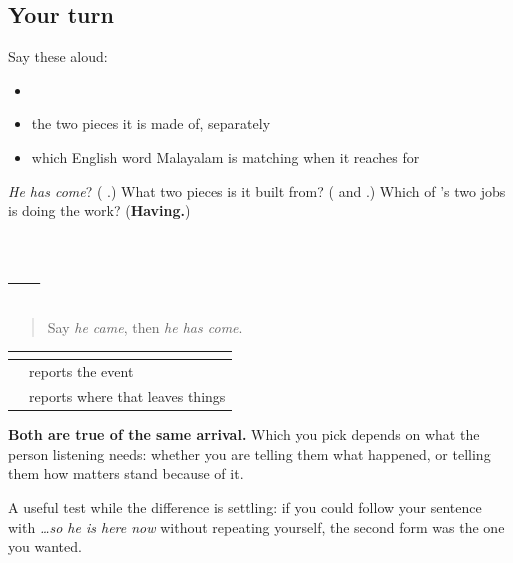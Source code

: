\subsection*{Your turn}
Say these aloud:

\begin{itemize}
\raggedright
  \item \textbf{ }
  \item the two pieces it is made of, separately
  \item which English word Malayalam is matching when it reaches for \textbf{}
\end{itemize}

\begin{tcolorbox}[breakable,colback=teal!4,colframe=teal!35!black,title={Before you move on}]
\emph{He has come}? (\textbf{ }.) What two pieces is it built from? (\textbf{} and \textbf{}.) Which of \textbf{}'s two jobs is doing the work? (\textbf{Having.})
\end{tcolorbox}
\section[Practice]{ — }

\label{lesson:ML-C111-past-or-perfect}



\begin{quote}
Say \emph{he came}, then \emph{he has come}.
\end{quote}

\begin{grammarlens}[title={Grammar Lens: which one a situation asks for}]
\noindent
\begin{tabularx}{\linewidth}{@{}>{\raggedright\arraybackslash}X>{\raggedright\arraybackslash}X@{}}
\toprule
\textbf{} & \textbf{} \\
\midrule
\textbf{\ml{അവൻ} \ml{വന്നു}} & reports the event \\
\textbf{\ml{അവൻ} \ml{വന്നിട്ടുണ്ട്}} & reports where that leaves things \\
\bottomrule
\end{tabularx}

\textbf{Both are true of the same arrival.} Which you pick depends on what the person listening needs: whether you are telling them what happened, or telling them how matters stand because of it.

A useful test while the difference is settling: if you could follow your sentence with \emph{…so he is here now} without repeating yourself, the second form was the one you wanted.
\end{grammarlens}

